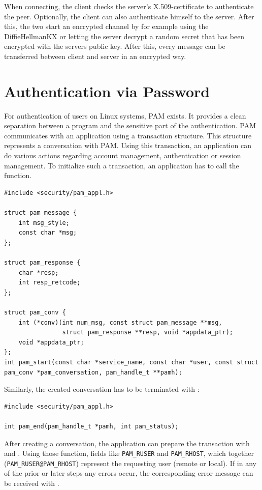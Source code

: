 \documentclass[10pt,a4paper,titlepage,twoside,english,final]{zhawreprt}
\begin{document}
When connecting, the client checks the server's \gls{X.509}-certificate to authenticate the peer.
Optionally, the client can also authenticate himself to the server.
After this, the two start an encrypted channel by for example using the \gls{DiffieHellmanKX} or letting the server decrypt a random secret that has been encrypted with the servers public key.
After this, every message can be transferred between client and server in an encrypted way.

\section{Authentication via Password}\label{sec:DesignAuthViaPw}
For authentication of users on Linux systems, \gls{PAM} exists.
It provides a clean separation between a program and the sensitive part of the authentication.
\gls{PAM} communicates with an application using a transaction structure.
This structure represents a conversation with \gls{PAM}.
Using this transaction, an application can do various actions regarding account management, authentication or session management.
To initialize such a transaction, an application has to call the \cite{pam_start} function.

\setlistingC
\begin{lstlisting}[caption={Initializing a \gls{PAM} conversation},label=lst:InitPAMConversation]
#include <security/pam_appl.h>

struct pam_message {
    int msg_style;
    const char *msg;
};

struct pam_response {
    char *resp;
    int resp_retcode;
};

struct pam_conv {
    int (*conv)(int num_msg, const struct pam_message **msg,
                struct pam_response **resp, void *appdata_ptr);
    void *appdata_ptr;
};
int pam_start(const char *service_name, const char *user, const struct pam_conv *pam_conversation, pam_handle_t **pamh);
\end{lstlisting}

Similarly, the created conversation has to be terminated with \cite{pam_end}:

\setlistingC
\begin{lstlisting}[caption={Terminating a \gls{PAM} conversation},label=lst:TermPAMConversation]
#include <security/pam_appl.h>

int pam_end(pam_handle_t *pamh, int pam_status);
\end{lstlisting}

After creating a conversation, the application can prepare the transaction with \cite{pam_set_item} and \cite{pam_get_item}.
Using those function, fields like \texttt{PAM\_RUSER} and \texttt{PAM\_RHOST}, which together (\texttt{PAM\_RUSER@PAM\_RHOST}) represent the requesting user (remote or local).
If in any of the prior or later steps any errors occur, the corresponding error message can be received with \cite{pam_strerror}.
\end{document}
